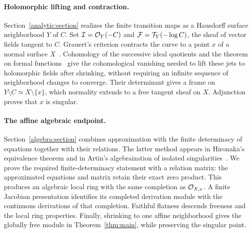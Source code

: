 \paragraph{Holomorphic lifting and contraction.}
Section~\ref{analytic:section} realizes the finite transition maps as
a Hausdorff surface neighborhood $Y$ of $C$. Set
$\mathcal I=\mathcal O_Y(-C)$ and $\mathcal F=\mathcal T_Y(-\log C)$, the sheaf of vector fields
tangent to $C$. Grauert's criterion contracts the curve to a point
$x$ of a normal surface $X$~\cite{Grauert1962}. Cohomology of the
successive ideal quotients and the theorem on formal
functions~\cite{Grauert1960} give the cohomological vanishing needed to
lift these jets to holomorphic fields after shrinking, without requiring
an infinite sequence of neighborhood
changes to converge. Their determinant gives a frame on
$Y\setminus C\simeq X\setminus\{x\}$, which normality extends to a
free tangent sheaf on $X$. Adjunction proves that $x$ is singular.

\paragraph{The affine algebraic endpoint.}
Section~\ref{algebra:section} combines approximation with the finite
determinacy of equations together with their relations. The latter
method appears in Hironaka's equivalence theorem
\cite[\S3, Theorem~3.3]{Hironaka1969} and in Artin's algebraization
of isolated singularities~\cite[Theorems~1.10 and~3.8--3.9]{Artin1969}.
We prove the required finite-determinacy statement with a relation matrix:
the approximated equations and matrix retain their exact zero product.
This produces an algebraic local ring with the same completion as
$\mathcal O_{X,x}$. A finite Jacobian presentation identifies its completed
derivation module with the continuous derivations of that completion.
Faithful flatness descends freeness and the local ring properties.
Finally, shrinking to one affine neighborhood gives the globally free
module in Theorem~\ref{thm:main}, while preserving the singular point.

